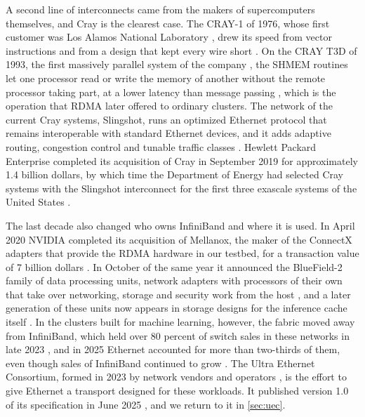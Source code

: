 A second line of interconnects came from the makers of supercomputers
themselves, and Cray is the clearest case. The CRAY-1 of 1976, whose first customer was Los Alamos National Laboratory
\citep{hpe_crayhistory}, drew its speed from vector instructions and from a
design that kept every wire short \citep{russell1978cray}. On the CRAY T3D
of 1993, the first massively parallel system of the company
\citep{hpe_crayhistory}, the SHMEM routines let one processor read or write the memory of another without the
remote processor taking part, at a lower latency than message passing
\citep{feind1995shmem}, which is the operation that RDMA later offered to
ordinary clusters. The network of the current Cray systems,
Slingshot, runs an optimized Ethernet protocol that remains interoperable
with standard Ethernet devices, and it adds adaptive routing, congestion
control and tunable traffic classes \citep{desensi2020slingshot}. Hewlett
Packard Enterprise completed its acquisition of Cray in September 2019 for
approximately 1.4 billion dollars, by which time the Department of Energy
had selected Cray systems with the Slingshot interconnect for the first
three exascale systems of the United States \citep{hpe2019cray}.

The last decade also changed who owns InfiniBand and where it is used. In
April 2020 NVIDIA completed its acquisition of Mellanox, the maker of the
ConnectX adapters that provide the RDMA hardware in our testbed, for a
transaction value of 7 billion dollars \citep{nvidia2020mellanox}. In
October of the same year it announced the BlueField-2 family of data
processing units, network adapters with processors of their own that take
over networking, storage and security work from the host
\citep{nvidia2020bluefield}, and a later generation of these units now
appears in storage designs for the inference cache itself
\citep{hsu2026fourtier}. In the clusters built for machine learning, however, the fabric moved away
from InfiniBand, which held over 80 percent of switch sales in these networks
in late 2023 \citep{delloro2025ethernet}, and in 2025
Ethernet accounted for more than two-thirds of them, even though sales of
InfiniBand continued to grow \citep{delloro2026ethernet}. The Ultra Ethernet
Consortium, formed in 2023 by network vendors and operators
\citep{uec2023launch}, is the effort to give Ethernet a transport designed
for these workloads. It published version 1.0 of its specification in June
2025 \citep{uecspec}, and we return to it in \cref{sec:uec}.

